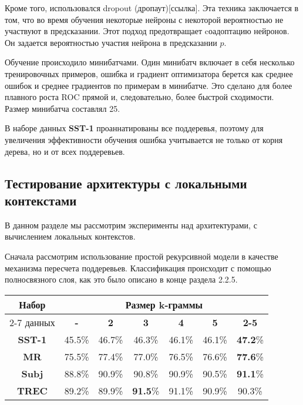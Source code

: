Кроме того, использовался dropout (дропаут)[ссылка]. 
Эта техника заключается в том, что во время обучения некоторые нейроны с некоторой вероятностью не участвуют в предсказании.
Этот подход предотвращает cоадоптацию нейронов. Он задается вероятностью участия нейрона в предсказании $p$.

Обучение происходило минибатчами. Один минибатч включает в себя несколько тренировочных примеров, ошибка и градиент оптимизатора
берется как среднее ошибок и среднее градиентов по примерам в минибатче. Это сделано для более плавного роста ROC прямой и, следовательно, более быстрой сходимости. Размер минибатча составлял 25.

В наборе данных \textbf{SST-1} проаннатированы все поддеревья, 
поэтому для увеличения эффективности обучения ошибка учитывается не только от корня дерева, но и от всех поддеревьев.

\subsection{Тестирование архитектуры с локальными контекстами}
В данном разделе мы рассмотрим эксперименты над архитектурами, с вычислением локальных контекстов.

Сначала рассмотрим использование простой рекурсивной модели в качестве механизма пересчета поддеревьев.
Классификация происходит с помощью полносвязного слоя, как это было описано в конце раздела 2.2.5.

\vspace{5mm}
\begin{minipage}{\linewidth}
 \label{tab:title} 
\begin{tabular}{|c|c|c|c|c|c|c|}
\hline
\multirow{2}{*}{Набор} &                \multicolumn{6}{c|}{Размер k-граммы} \\ \cline{2-7} 
     данных            & \textbf{-} & \textbf{2} & \textbf{3} & \textbf{4} & \textbf{5} & \textbf{2-5} \\ \hline
\textbf{SST-1}         & 45.5\%     & 46.7\%     & 46.3\%     & 46.1\%     &  46.1\%    & \textbf{47.2}\% \\ \hline
\textbf{MR}            & 75.5\%     & 77.4\%     & 77.0\%     & 76.5\%     &  76.6\%    & \textbf{77.6}\%  \\ \hline
\textbf{Subj}          & 88.8\%     & 90.9\%     & 90.8\%     & 90.9\%     &  90.5\%    & \textbf{91.1}\% \\ \hline
\textbf{TREC}          & 89.2\%     & 89.9\%     & \textbf{91.5}\%     & 91.1\%     &  90.9\%    & 90.3\% \\ \hline
\end{tabular}
\end{minipage}
\vspace{5mm}

